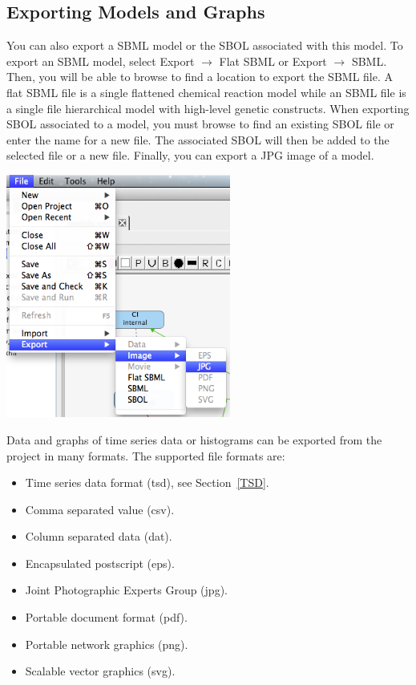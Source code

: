 \documentclass[titlepage,11pt]{article}
\begin{document}
\subsection{Exporting Models and Graphs}

\noindent
You can also export a SBML model or the SBOL associated with this model.  To export an SBML model, select  Export $\rightarrow$ Flat SBML or Export $\rightarrow$ SBML.  Then, you will be able to browse to find a location to export the SBML file.  A flat SBML file is a single flattened chemical reaction model while an SBML file is a single file hierarchical model with high-level genetic constructs.  
When exporting SBOL associated to a model, you must browse to find an existing SBOL file or enter the name for a new file.  The associated SBOL will then be added to the selected file or a new file.  Finally, you can export a JPG image of a model.

\begin{center}
\includegraphics[height=80mm]{screenshots/export}
\end{center} 

Data and graphs of time series data or histograms can be exported from the project in many formats.  The supported file formats are:  
\begin{itemize}
\item Time series data format (tsd), see Section~\ref{TSD}.
\item Comma separated value (csv).
\item Column separated data (dat).
\item Encapsulated postscript (eps). 
\item Joint Photographic Experts Group (jpg). 
\item Portable document format (pdf).
\item Portable network graphics (png). 
\item Scalable vector graphics (svg).
\end{itemize}
\end{document}
